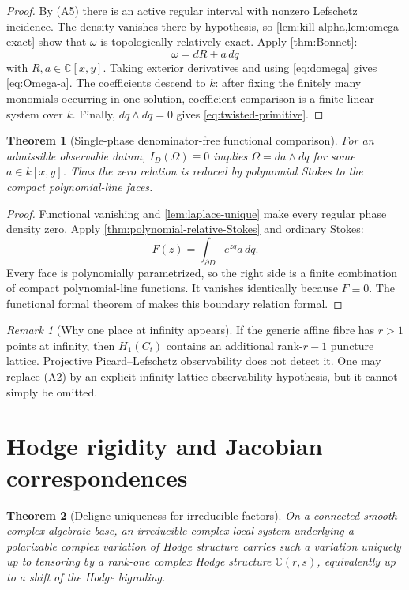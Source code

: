 \documentclass[11pt]{article}
\numberwithin{equation}{section}
\newtheorem{theorem}{Theorem}[section]
\theoremstyle{definition}
\theoremstyle{remark}
\newtheorem{remark}[remark]{Remark}
\newcommand{\C}{\mathbb C}
\begin{document}
\begin{proof}
By \textup{(A5)} there is an active regular interval with nonzero Lefschetz
incidence.  The density vanishes there by hypothesis, so
\cref{lem:kill-alpha,lem:omega-exact} show that $\omega$ is topologically
relatively exact.  Apply \cref{thm:Bonnet}:
\[
  \omega=dR+a\,dq
\]
with $R,a\in\C[x,y]$.  Taking exterior derivatives and using
\eqref{eq:domega} gives \eqref{eq:Omega-a}.  The coefficients descend to
$k$: after fixing the finitely many monomials occurring in one solution,
coefficient comparison is a finite linear system over $k$.  Finally,
$dq\wedge dq=0$ gives \eqref{eq:twisted-primitive}.
\end{proof}

\begin{theorem}[Single-phase denominator-free functional comparison]
\label{thm:intro-single}
For an admissible observable datum, $I_D(\Omega)\equiv0$ implies
$\Omega=da\wedge dq$ for some $a\in k[x,y]$. Thus the zero relation is
reduced by polynomial Stokes to the compact polynomial-line faces.
\end{theorem}
\begin{proof}
Functional vanishing and \cref{lem:laplace-unique} make every regular phase
density zero.  Apply \cref{thm:polynomial-relative-Stokes} and ordinary
Stokes:
\[
  F(z)=\int_{\partial D}e^{zq}a\,dq.
\]
Every face is polynomially parametrized, so the right side is a finite
combination of compact polynomial-line functions.  It vanishes identically
because $F\equiv0$.  The functional formal theorem of
\cite{LongLinearKZ} makes this boundary relation formal.
\end{proof}

\begin{remark}[Why one place at infinity appears]\label{rem:infinity}
If the generic affine fibre has $r>1$ points at infinity, then
$H_1(C_t)$ contains an additional rank-$r-1$ puncture lattice.  Projective
Picard--Lefschetz observability does not detect it.  One may replace
\textup{(A2)} by an explicit infinity-lattice observability hypothesis, but it
cannot simply be omitted.
\end{remark}

\section{Hodge rigidity and Jacobian correspondences}\label{sec:Hodge}

\begin{theorem}[Deligne uniqueness for irreducible factors]
\label{thm:Deligne-unique}
On a connected smooth complex algebraic base, an irreducible complex
local system underlying a polarizable complex variation of Hodge structure
carries such a variation uniquely up to tensoring
by a rank-one complex Hodge structure $\C(r,s)$, equivalently up to a shift of
the Hodge bigrading.
\end{theorem}
\end{document}
